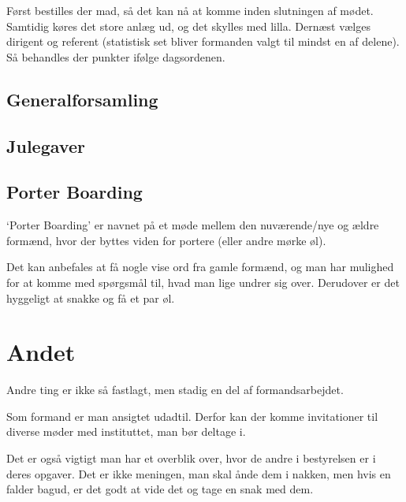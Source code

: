Først bestilles der mad, så det kan nå at komme inden slutningen af
mødet. Samtidig køres det store anlæg ud, og det skylles med
lilla. Dernæst vælges dirigent og referent (statistisk set bliver
formanden valgt til mindst en af delene). Så behandles der punkter
ifølge dagsordenen.

\subsection{Generalforsamling}
\label{sec:generalforsamling}


\subsection{Julegaver}
\label{sec:julegaver}


\subsection{Porter Boarding}
\label{sec:porter-boarding}

`Porter Boarding' er navnet på et møde mellem den nuværende/nye
og ældre formænd, hvor der byttes viden for portere (eller andre mørke
øl).

Det kan anbefales at få nogle vise ord fra gamle formænd, og man har
mulighed for at komme med spørgsmål til, hvad man lige undrer sig
over. Derudover er det hyggeligt at snakke og få et par øl.

\section{Andet}
\label{sec:andet}

Andre ting er ikke så fastlagt, men stadig en del af formandsarbejdet.

Som formand er man ansigtet udadtil. Derfor kan der komme invitationer
til diverse møder med instituttet, man bør deltage i.

Det er også vigtigt man har et overblik over, hvor de andre i
bestyrelsen er i deres opgaver. Det er ikke meningen, man skal ånde
dem i nakken, men hvis en falder bagud, er det godt at vide det og
tage en snak med dem.



